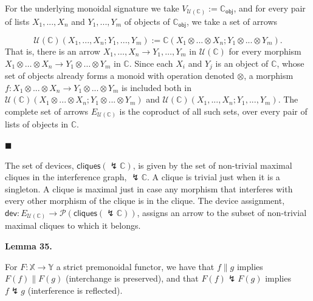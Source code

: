 \documentclass[10pt,a4paper]{article}
\begin{document}
For the underlying monoidal signature we take $V_{\mathcal{U}(\mathbb{C})}:=\mathbb{C}_{\mathsf{obj}}$, and for every pair of lists $X_{1},...,X_{n}$ and $Y_{1},...,Y_{m}$ of objects of $\mathbb{C}_{\mathsf{obj}}$, we take a set of arrows\par
    \[\mathcal{U}(\mathbb{C})(X_{1},...,X_{n};Y_{1},...,Y_{m}):=\mathbb{C}(X_{1}\otimes...\otimes X_{n};Y_{1}\otimes...\otimes Y_{m}).\]    
That is, there is an arrow $X_{1},\ldots,X_{n}\to Y_{1},\ldots,Y_{m}$ in $\mathcal{U}(\mathbb{C})$ for every morphism $X_{1}\otimes\ldots\otimes X_{n}\to Y_{1}\otimes\ldots\otimes Y_{m}$ in $\mathbb{C}$. Since each $X_{i}$ and $Y_{j}$ is an object of $\mathbb{C}$, whose set of objects already forms a monoid with operation denoted $\otimes$, a morphism $f:X_{1}\otimes...\otimes X_{n}\to Y_{1}\otimes...\otimes Y_{m}$ is included both in $\mathcal{U}(\mathbb{C})(X_{1}\otimes...\otimes X_{n};Y_{1}\otimes...\otimes Y_{m})$ and $\mathcal{U}(\mathbb{C})(X_{1},...,X_{n};Y_{1},...,Y_{m})$. The complete set of arrows $E_{\mathcal{U}(\mathbb{C})}$ is the coproduct of all such sets, over every pair of lists of objects in $\mathbb{C}$.\par
 
 
 
\par\noindent  $\blacksquare$ 
 
The set of devices, $\mathsf{cliques}({\lightning}\mathbb{C})$, is given by the set of non-trivial maximal cliques in the interference graph, ${\lightning}\mathbb{C}$. A clique is trivial just when it is a singleton. A clique is maximal just in case any morphism that interferes with every other morphism of the clique is in the clique. The device assignment, $\mathsf{dev}:E_{\mathcal{U}(\mathbb{C})}\to\mathscr{P}(\mathsf{cliques}({\lightning}\mathbb{C}))$, assigns an arrow to the subset of non-trivial maximal cliques to which it belongs.\par
 
 
  
 
 
 
\par\medskip\noindent\textbf{Lemma 35.}\par
 
 
For $F:\mathbb{X}\to\mathbb{Y}$ a strict premonoidal functor, we have that $f\parallel g$ implies $F(f)\parallel F(g)$ (interchange is preserved), and that $F(f)\lightning F(g)$ implies $f\lightning g$ (interference is reflected).\par
 
\end{document}
